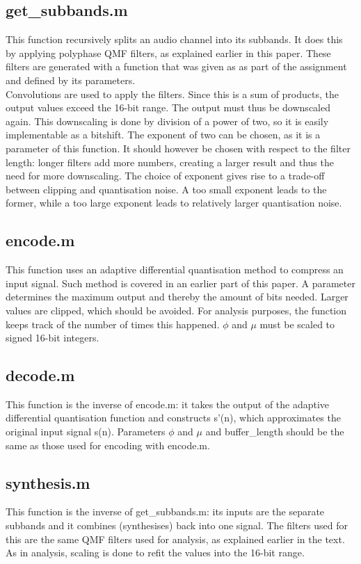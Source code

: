 \documentclass[a4paper]{article}
\begin{document}
\subsection{get\_subbands.m}
This function recursively splits an audio channel into its subbands. It does this by applying polyphase QMF filters, as explained earlier in this paper. These filters are generated with a function that was given as as part of the assignment and defined by its parameters.\\
Convolutions are used to apply the filters. Since this is a sum of products, the output values exceed the 16-bit range. The output must thus be downscaled again. This downscaling is done by division of a power of two, so it is easily implementable as a bitshift. The exponent of two can be chosen, as it is a parameter of this function. It should however be chosen with respect to the filter length: longer filters add more numbers, creating a larger result and thus the need for more downscaling. The choice of exponent gives rise to a trade-off between clipping and quantisation noise. A too small exponent leads to the former, while a too large exponent leads to relatively larger quantisation noise.

\subsection{encode.m}
This function uses an adaptive differential quantisation method to compress an input signal. Such method is covered in an earlier part of this paper. A parameter determines the maximum output and thereby the amount of bits needed. Larger values are clipped, which should be avoided. For analysis purposes, the function keeps track of the number of times this happened. $\phi$ and $\mu$ must be scaled to signed 16-bit integers.

\subsection{decode.m}
This function is the inverse of encode.m: it takes the output of the adaptive differential quantisation function and constructs s'(n), which approximates the original input signal s(n). Parameters $\phi$ and $\mu$ and buffer\_length should be the same as those used for encoding with encode.m.

\subsection{synthesis.m}
This function is the inverse of get\_subbands.m: its inputs are the separate subbands and it combines (synthesises) back into one signal. The filters used for this are the same QMF filters used for analysis, as explained earlier in the text. As in analysis, scaling is done to refit the values into the 16-bit range.
\end{document}
